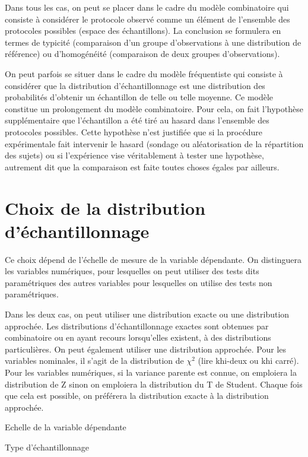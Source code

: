 \documentclass[]{book}
\theoremstyle{definition}
\theoremstyle{definition}
\theoremstyle{definition}
\theoremstyle{remark}
\begin{document}
Dans tous les cas, on peut se placer dans le cadre du modèle
combinatoire qui consiste à considérer le protocole observé comme un
élément de l'ensemble des protocoles possibles (espace des
échantillons). La conclusion se formulera en termes de typicité
(comparaison d'un groupe d'observations à une distribution de référence)
ou d'homogénéité (comparaison de deux groupes d'observations).

On peut parfois se situer dans le cadre du modèle fréquentiste qui
consiste à considérer que la distribution d'échantillonnage est une
distribution des probabilités d'obtenir un échantillon de telle ou telle
moyenne. Ce modèle constitue un prolongement du modèle combinatoire.
Pour cela, on fait l'hypothèse supplémentaire que l'échantillon a été
tiré au hasard dans l'ensemble des protocoles possibles. Cette hypothèse
n'est justifiée que si la procédure expérimentale fait intervenir le
hasard (sondage ou aléatorisation de la répartition des sujets) ou si
l'expérience vise véritablement à tester une hypothèse, autrement dit
que la comparaison est faite toutes choses égales par ailleurs.

\hypertarget{choix-de-la-distribution-dechantillonnage}{%
\section{Choix de la distribution
d'échantillonnage}\label{choix-de-la-distribution-dechantillonnage}}

Ce choix dépend de l'échelle de mesure de la variable dépendante. On
distinguera les variables numériques, pour lesquelles on peut utiliser
des tests dits paramétriques des autres variables pour lesquelles on
utilise des tests non paramétriques.

Dans les deux cas, on peut utiliser une distribution exacte ou une
distribution approchée. Les distributions d'échantillonnage exactes sont
obtenues par combinatoire ou en ayant recours lorsqu'elles existent, à
des distributions particulières. On peut également utiliser une
distribution approchée. Pour les variables nominales, il s'agit de la
distribution de \(\chi^{2}\) (lire khi-deux ou khi carré). Pour les
variables numériques, si la variance parente est connue, on emploiera la
distribution de Z sinon on emploiera la distribution du T de Student.
Chaque fois que cela est possible, on préférera la distribution exacte à
la distribution approchée.

Echelle de la variable dépendante

Type d'échantillonnage
\end{document}
